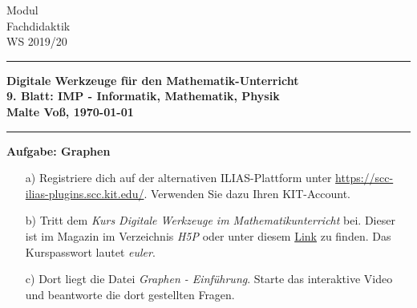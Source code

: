 \documentclass[a4paper,11pt]{scrreprt} %
\theoremstyle{definition} %
\begin{document}
%
\hfill \parbox{22mm}
{ 
Modul \\ Fachdidaktik \\ WS 2019/20 
}

\rule{\textwidth}{1pt}                                   %
%
\begin{center}
\textbf{
Digitale Werkzeuge für den Mathematik-Unterricht \\[1ex] %
%
{
\Large 9. Blatt:  \glqq IMP - Informatik, Mathematik, Physik\grqq } \\[1ex]
%
%
Malte Vo\ss, \today
}
\end{center}
% 
\rule{\textwidth}{1pt}                                 %
\vspace*{.5cm} 
 
\textbf{Aufgabe: Graphen}
\begin{enumerate}
    \item[a)] 
        Registriere dich auf der alternativen ILIAS-Plattform unter
        \url{https://scc-ilias-plugins.scc.kit.edu/}. 
        Verwenden Sie dazu Ihren KIT-Account.

    \item[b)]
        Tritt dem \emph{Kurs Digitale Werkzeuge im Mathematikunterricht} bei.
        Dieser ist im Magazin im Verzeichnis \emph{H5P} oder unter diesem 
        \href{https://scc-ilias-plugins.scc.kit.edu/goto.php?target=crs_5451&client_id=pilot}{Link}
        zu finden.
        Das Kurspasswort lautet \emph{euler}.

    \item[c)]
        Dort liegt die Datei \emph{Graphen - Einführung}. 
        Starte das interaktive Video und beantworte die dort gestellten Fragen.
\end{enumerate}
%

\vspace{3ex}
\end{document}
